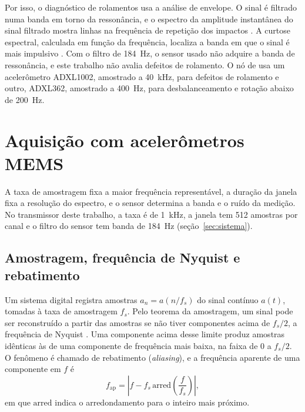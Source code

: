 Por isso, o diagnóstico de rolamentos usa a análise de envelope. O sinal é filtrado numa banda em torno da ressonância, e o espectro da amplitude instantânea do sinal filtrado mostra linhas na frequência de repetição dos impactos \cite{randall2011}. A curtose espectral, calculada em função da frequência, localiza a banda em que o sinal é mais impulsivo \cite{antoni2006,antoni2007}. Com o filtro de \SI{184}{\hertz}, o sensor usado não adquire a banda de ressonância, e este trabalho não avalia defeitos de rolamento. O nó de  usa um acelerômetro ADXL1002, amostrado a \SI{40}{\kilo\hertz}, para defeitos de rolamento e outro, ADXL362, amostrado a \SI{400}{\hertz}, para desbalanceamento e rotação abaixo de \SI{200}{\hertz}.

\section{Aquisição com acelerômetros MEMS}\label{sec:fund-aquisicao}

A taxa de amostragem fixa a maior frequência representável, a duração da janela fixa a resolução do espectro, e o sensor determina a banda e o ruído da medição. No transmissor deste trabalho, a taxa é de \SI{1}{\kilo\hertz}, a janela tem \num{512} amostras por canal e o filtro do sensor tem banda de \SI{184}{\hertz} (seção~\ref{sec:sistema}).

\subsection{Amostragem, frequência de Nyquist e rebatimento}\label{sec:fund-amostragem}

Um sistema digital registra amostras $a_n = a(n/f_s)$ do sinal contínuo $a(t)$, tomadas à taxa de amostragem $f_s$. Pelo teorema da amostragem, um sinal pode ser reconstruído a partir das amostras se não tiver componentes acima de $f_s/2$, a frequência de Nyquist \cite{brandt2011}. Uma componente acima desse limite produz amostras idênticas às de uma componente de frequência mais baixa, na faixa de 0 a $f_s/2$. O fenômeno é chamado de rebatimento (\textit{aliasing}), e a frequência aparente de uma componente em $f$ é
\begin{equation}
f_{\mathrm{ap}} = \left| f - f_s \, \mathrm{arred}\!\left(\frac{f}{f_s}\right) \right|,
\label{eq:fund-rebatimento}
\end{equation}
em que $\mathrm{arred}$ indica o arredondamento para o inteiro mais próximo.

